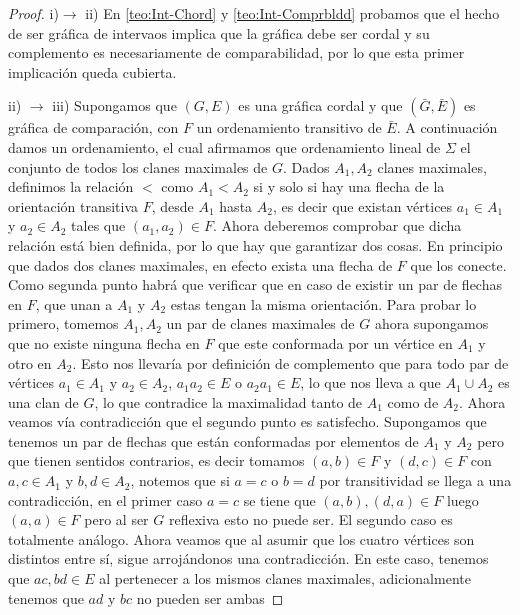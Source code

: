 \begin{proof}
    i)$\to$ ii) En \cref{teo:Int-Chord} y \cref{teo:Int-Comprbldd} probamos que
    el hecho de ser gráfica de intervaos implica que la gráfica debe ser cordal
    y su complemento es necesariamente de comparabilidad, por lo que esta primer
    implicación queda cubierta.
    
    ii) $\to$ iii) Supongamos que $(G,E)$ es una gráfica cordal y que $(\bar{G},
    \bar{E})$ es gráfica de comparación, con $F$ un ordenamiento transitivo de
    $\bar{E}$. A continuación damos un ordenamiento, el cual afirmamos que
    ordenamiento lineal de $\Sigma$ el conjunto de todos los clanes maximales de
    $G$. Dados  $A_1, A_2$ clanes maximales, definimos la relación $<$ como $A_1
    < A_2$ si y solo si hay una flecha de la orientación transitiva $F$, desde
    $A_1$ hasta $A_2$, es decir que existan vértices $a_1 \in A_1$ y $a_2 \in
    A_2$ tales que $(a_1,a_2)\in F$. Ahora deberemos comprobar que dicha
    relación está bien definida, por lo que hay que garantizar dos cosas. En
    principio que dados dos clanes maximales, en efecto exista una flecha de $F$
    que los conecte. Como segunda punto habrá que verificar que en caso de
    existir un par de flechas en $F$, que unan a $A_1$ y $A_2$ estas tengan la
    misma orientación. Para probar lo primero, tomemos $A_1,A_2$ un par de
    clanes maximales de $G$ ahora supongamos que no existe ninguna flecha en $F$
    que este conformada por un vértice en $A_1$ y otro en $A_2$. Esto nos
    llevaría por definición de complemento que para todo par de vértices $a_1\in
    A_1$ y $a_2 \in A_2$,  $a_1a_2\in E$ o $a_2a_1\in E$, lo que nos lleva a que
    $A_1 \cup A_2$ es una clan de $G$, lo que contradice la maximalidad tanto de
    $A_1$ como de $A_2$. Ahora veamos vía contradicción que el segundo punto es
    satisfecho. Supongamos que tenemos un par de flechas que están conformadas
    por elementos de $A_1$ y $A_2$ pero que tienen sentidos contrarios, es decir
    tomamos $(a,b)\in F$ y $(d,c)\in F$ con $a,c \in A_1$ y $b,d\in A_2$,
    notemos que si $a=c $ o $b=d$ por transitividad se llega a una
    contradicción, en el primer caso $a=c$ se tiene que $(a,b), (d,a)\in F$
    luego $(a,a)\in F$ pero al ser $G$ reflexiva esto no puede ser. El segundo
    caso es totalmente análogo. Ahora veamos que al asumir que los cuatro
    vértices son distintos entre sí, sigue arrojándonos una contradicción. En
    este caso, tenemos que $ac, bd\in E$ al pertenecer a los mismos clanes
    maximales, adicionalmente tenemos que $ad$ y $bc$ no pueden ser ambas

\end{proof}

